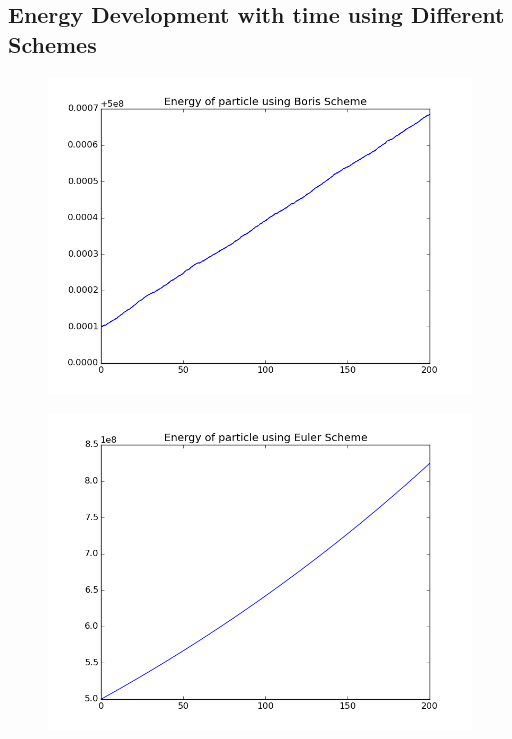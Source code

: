 \documentclass[11pt, a4paper]{article}
\begin{document}
\subsection{Energy Development with time using Different Schemes}
\begin{figure}[H]
 \centering
 \includegraphics[width = \textwidth]{q1_energy_boris.png}
\end{figure}
\begin{figure}[H]
 \centering
 \includegraphics[width = \textwidth]{q1_energy_euler.png}
\end{figure}
\end{document}
